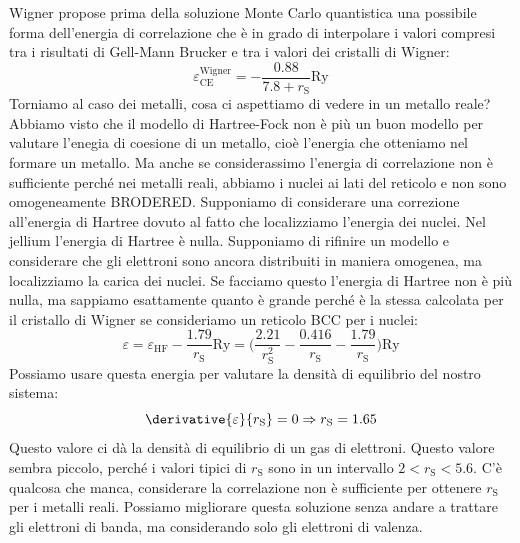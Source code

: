 Wigner propose prima della soluzione Monte Carlo quantistica una possibile forma dell'energia di correlazione che è in grado di interpolare i valori compresi tra i risultati di Gell-Mann Brucker e tra i valori dei cristalli di Wigner:
\begin{equation*}
    \varepsilon_\text{CE}^\text{Wigner}=-\frac{0.88}{7.8+r_\text{S}}\text{Ry}
\end{equation*}
Torniamo al caso dei metalli, cosa ci aspettiamo di vedere in un metallo reale? Abbiamo visto che il modello di Hartree-Fock non è più un buon modello per valutare l'enegia di coesione di un metallo, cioè l'energia che otteniamo nel formare un metallo. Ma anche se considerassimo l'energia di correlazione non è sufficiente perché nei metalli reali, abbiamo i nuclei ai lati del reticolo e non sono omogeneamente BRODERED. Supponiamo di considerare una correzione all'energia di Hartree dovuto al fatto che localizziamo l'energia dei nuclei. Nel jellium l'energia di Hartree è nulla. Supponiamo di rifinire un modello e considerare che gli elettroni sono ancora distribuiti in maniera omogenea, ma localizziamo la carica dei nuclei. Se facciamo questo l'energia di Hartree non è più nulla, ma sappiamo esattamente quanto è grande perché è la stessa calcolata per il cristallo di Wigner se consideriamo un reticolo BCC per i nuclei:
\begin{equation*}
    \varepsilon=\varepsilon_{\text{HF}}-\frac{1.79}{r_\text{S}}\text{Ry}=\bigg(\frac{2.21}{r_\text{S}^2}-\frac{0.416}{r_\text{S}}-\frac{1.79}{r_\text{S}}\bigg)\text{Ry}
\end{equation*}
Possiamo usare questa energia per valutare la densità di equilibrio del nostro sistema:
\begin{equation*}
    \derivative{\varepsilon}{r_\text{S}}=0 \Rightarrow r_\text{S} = 1.65
\end{equation*}
Questo valore ci dà la densità di equilibrio di un gas di elettroni. Questo valore sembra piccolo, perché i valori tipici di $r_\text{S}$ sono in un intervallo $2<r_\text{S}<5.6$. C'è qualcosa che manca, considerare la correlazione non è sufficiente per ottenere $r_\text{S}$ per i metalli reali. Possiamo migliorare questa soluzione senza andare a trattare gli elettroni di banda, ma considerando solo gli elettroni di valenza.